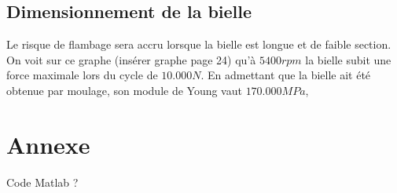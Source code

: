 \documentclass[a4paper,oneside,12pt]{report}
\begin{document}
\section{Dimensionnement de la bielle}

Le risque de flambage sera accru lorsque la bielle est longue et de faible section.
On voit sur ce graphe (insérer graphe page 24) qu'à $5400rpm$ la bielle subit une force maximale lors du cycle de $10.000 N$.
En admettant que la bielle ait été obtenue par moulage, son module de Young vaut $170.000 MPa$, 

\chapter{Annexe}

Code Matlab ?
\end{document}
